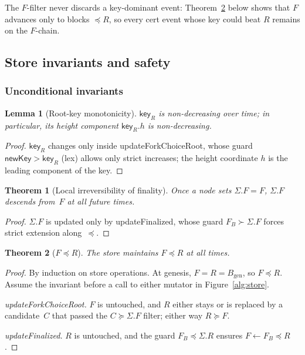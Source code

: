 \documentclass{article}
\newcommand{\genesis}{\ensuremath{B_{\mathrm{gen}}}}
\newcommand{\key}{\mathsf{key}}
\newcommand{\newKey}{\mathsf{newKey}}
\newcommand{\updateForkChoiceRoot}{\textsf{updateForkChoiceRoot}\xspace}
\newcommand{\updateFinalized}{\textsf{updateFinalized}\xspace}
\theoremstyle{plain}
\newtheorem{theorem}{Theorem}
\newtheorem{lemma}{Lemma}
\theoremstyle{definition}
\theoremstyle{remark}
\begin{document}
The $F$-filter never discards a key-dominant event: Theorem~\ref{thm:fleqr} below shows that $F$ advances only to blocks $\preceq R$, so every cert event whose key could beat $R$ remains on the $F$-chain.

\subsection{Store invariants and safety}

\subsubsection*{Unconditional invariants}

\begin{lemma}[Root-key monotonicity]\label{lem:Rs-key-monotone}
$\key_R$ is non-decreasing over time; in particular, its height component $\key_R.h$ is non-decreasing.
\end{lemma}

\begin{proof}
$\key_R$ changes only inside \updateForkChoiceRoot, whose guard $\newKey > \key_R$ (lex) allows only strict increases; the height coordinate $h$ is the leading component of the key.
\end{proof}

\begin{theorem}[Local irreversibility of finality]\label{thm:finperm}
Once a node sets $\Sigma.F = F$, $\Sigma.F$ descends from~$F$ at all future times.
\end{theorem}

\begin{proof}
$\Sigma.F$ is updated only by \updateFinalized, whose guard $F_B \succ \Sigma.F$ forces strict extension along~$\preceq$.
\end{proof}

\begin{theorem}[$F \preceq R$]\label{thm:fleqr}
The store maintains $F \preceq R$ at all times.
\end{theorem}

\begin{proof}
By induction on store operations.
At genesis, $F = R = \genesis$, so $F \preceq R$.
Assume the invariant before a call to either mutator in Figure~\ref{alg:store}.

\emph{\updateForkChoiceRoot.}
$F$ is untouched, and $R$ either stays or is replaced by a candidate~$C$ that passed the $C \succeq \Sigma.F$ filter; either way $R \succeq F$.

\emph{\updateFinalized.}
$R$ is untouched, and the guard $F_B \preceq \Sigma.R$ ensures $F \gets F_B \preceq R$.
\end{proof}
\end{document}
